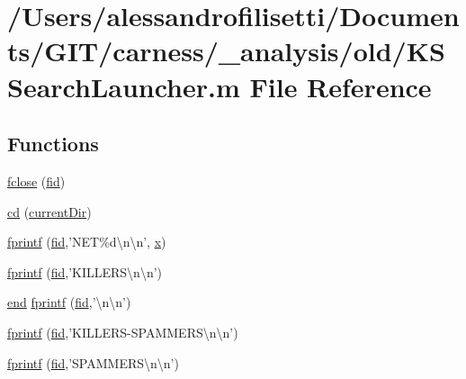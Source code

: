 \hypertarget{a00031}{\section{/\-Users/alessandrofilisetti/\-Documents/\-G\-I\-T/carness/\-\_\-analysis/old/\-K\-S\-Search\-Launcher.m File Reference}
\label{a00031}
}
\subsection*{Functions}
\begin{DoxyCompactItemize}
\item 
\hyperlink{a00031_a5e769bbbabcaddc548203741c7100228}{fclose} (\hyperlink{a00031_ae9011d40c6f13e68e6f07156e0da7c5d}{fid})
\item 
\hyperlink{a00031_a4241e59001a956990321a269c236c993}{cd} (\hyperlink{a00031_af32eb97339f1e9d37b5540de2cbc79c9}{current\-Dir})
\item 
\hyperlink{a00031_a21172d88d238291f06b91067ea53f814}{fprintf} (\hyperlink{a00031_ae9011d40c6f13e68e6f07156e0da7c5d}{fid},'N\-E\-T\%d\textbackslash{}n\textbackslash{}n', \hyperlink{a00031_a7265972fe485274cfff77a9bb07b8fce}{x})
\item 
\hyperlink{a00031_a2bff3632fad7bca512140377cbce79ef}{fprintf} (\hyperlink{a00031_ae9011d40c6f13e68e6f07156e0da7c5d}{fid},'K\-I\-L\-L\-E\-R\-S\textbackslash{}n\textbackslash{}n')
\item 
\hyperlink{a00025_afb358f48b1646c750fb9da6c6585be2b}{end} \hyperlink{a00031_a0921b3966bd3417e73b391d1e3d61c72}{fprintf} (\hyperlink{a00031_ae9011d40c6f13e68e6f07156e0da7c5d}{fid},'\textbackslash{}n\textbackslash{}n')
\item 
\hyperlink{a00031_a4b2068e6157d1e5aeba754398e689fec}{fprintf} (\hyperlink{a00031_ae9011d40c6f13e68e6f07156e0da7c5d}{fid},'K\-I\-L\-L\-E\-R\-S-\/S\-P\-A\-M\-M\-E\-R\-S\textbackslash{}n\textbackslash{}n')
\item 
\hyperlink{a00031_a194b6c53d0062802894434f7555c8e40}{fprintf} (\hyperlink{a00031_ae9011d40c6f13e68e6f07156e0da7c5d}{fid},'S\-P\-A\-M\-M\-E\-R\-S\textbackslash{}n\textbackslash{}n')
\end{DoxyCompactItemize}

